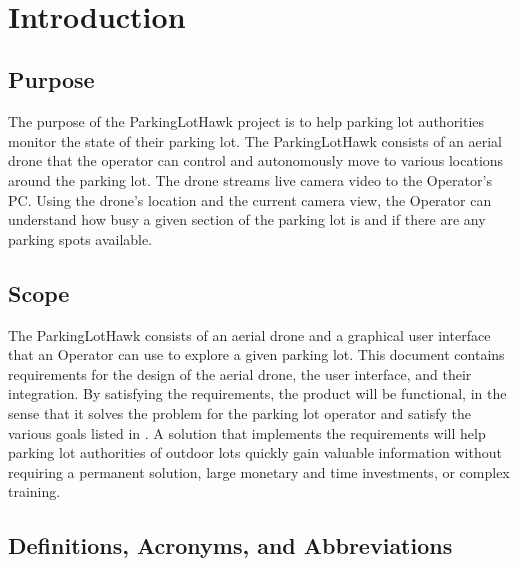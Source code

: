 \documentclass{article}
\begin{document}
~\newpage


\section{Introduction}
\label{sec:Intro}
\subsection{Purpose}
The purpose of the ParkingLotHawk project is to help parking lot authorities monitor the state of their parking lot. The ParkingLotHawk consists of an aerial drone that the operator can control and autonomously move to various locations around the parking lot. The drone streams live camera video to the Operator's PC. Using the drone's location and the current camera view, the Operator can understand how busy a given section of the parking lot is and if there are any parking spots available. 
\subsection{Scope}
The ParkingLotHawk consists of an aerial drone and a graphical user interface that an Operator can use to explore a given parking lot. This document contains requirements for the design of the aerial drone, the user interface, and their integration. By satisfying the requirements, the product will be functional,  in the sense that it solves the problem for the parking lot operator and satisfy the various goals listed in . A solution that implements the requirements will help parking lot authorities of outdoor lots quickly gain valuable information without requiring a permanent solution, large monetary and time investments, or complex training. 

\subsection{Definitions, Acronyms, and Abbreviations}
\end{document}
